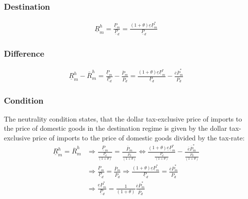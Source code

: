 \subsubsection*{Destination}
\begin{equation}\label{mcon.d}
\begin{aligned}
\underline R^h_m = \frac{\underline P_m}{\underline P_d} = \frac{ \left( 1 + \theta \right) \underline e \underline P^*_m}{\underline P_d}
\end{aligned} 
\end{equation}

\subsubsection*{Difference}
\begin{equation} \label{mcon.diff}
\begin{aligned}
\underline R^h_m - \overline R^h_m = \frac{\underline P_m}{\underline P_d} - \frac{\overline P_m}{\overline P_d}= \frac{ \left( 1 + \theta \right) \underline e \underline P^*_m}{\underline P_d} - \frac{\overline e \overline P^*_m}{\overline P_d}
\end{aligned} 
\end{equation}

\subsubsection*{Condition}
The neutrality condition states, that the dollar tax-exclusive price of imports to the price of domestic goods in the destination regime is given by the dollar tax-exclusive price of imports to the price of domestic goods divided by the tax-rate:
\begin{equation}\label{mcon.con}
\begin{aligned}
\underline R^h_m = \overline R^h_m &\Rightarrow \frac{\underline P_m}{\frac{\underline P_d}{ \left( 1+\theta \right) }} = \frac{\overline P_m}{\frac{\overline P_d}{ \left( 1+\theta \right) }} \Leftrightarrow \frac{ \left( 1+\theta \right) \underline e \underline P^*_m}{\frac{\underline P_d}{ \left( 1+\theta \right) }} - \frac{\overline e \overline P^*_m}{\frac{\overline P_d}{ \left( 1+\theta \right) }} \\ &\Rightarrow \frac{\underline P_m}{\underline P_d} = \frac{\overline P_m}{\overline P_d} \Rightarrow \frac{ \left( 1+\theta \right) \underline e \underline P^*_m}{{\underline P_d}} = \frac{\overline e \overline P^*_m}{\overline P_d}  \\ &\Rightarrow \frac{\underline e \underline P^*_m}{{\underline P_d}} = \frac{1}{ \left( 1+\theta \right) } \frac{\overline e \overline P^*_m}{\overline P_d}
\end{aligned} 
\end{equation}


